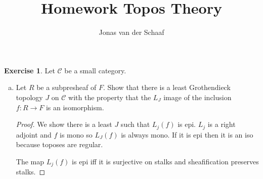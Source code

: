 \documentclass{article}
\title{Homework Topos Theory}
\author{Jonas van der Schaaf}
\date{}
\newcommand{\cat}{\mathcal{C}}
\theoremstyle{definition}
\newtheorem{question}{Exercise}
\begin{document}
\maketitle

\begin{question}
    Let \(\cat\) be a small category.

    \begin{enumerate}[a)]
        \item Let \(R\) be a subpresheaf of \(F\). Show that there is a least
              Grothendieck topology \(J\) on \(\cat\) with the property that the
              \(L_{J}\) image of the inclusion \(f:R\to F\) is an isomorphism.

              \begin{proof}
                  We show there is a least \(J\) such that \(L_{j}(f)\) is epi.
                  \(L_{j}\) is a right adjoint and \(f\) is mono so \(L_{J}(f)\)
                  is always mono. If it is epi then it is an iso because toposes
                  are regular.

                  The map \(L_{j}(f)\) is epi iff it is surjective on stalks and
                  sheafification preserves stalks.
              \end{proof}
    \end{enumerate}
\end{question}
\end{document}
